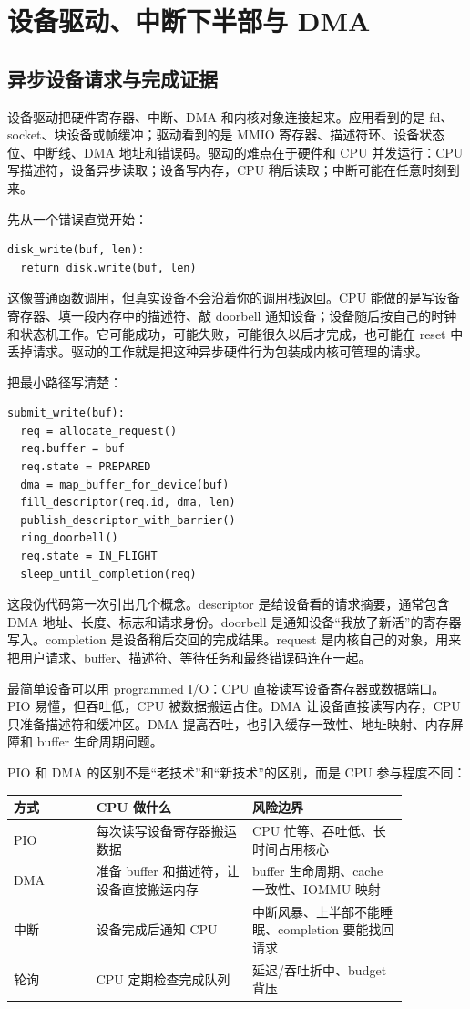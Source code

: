 \chapter{设备驱动、中断下半部与 DMA}

\section{异步设备请求与完成证据}

设备驱动把硬件寄存器、中断、DMA 和内核对象连接起来。应用看到的是 fd、socket、块设备或帧缓冲；驱动看到的是 MMIO 寄存器、描述符环、设备状态位、中断线、DMA 地址和错误码。驱动的难点在于硬件和 CPU 并发运行：CPU 写描述符，设备异步读取；设备写内存，CPU 稍后读取；中断可能在任意时刻到来。

先从一个错误直觉开始：

\begin{lstlisting}
disk_write(buf, len):
  return disk.write(buf, len)
\end{lstlisting}

这像普通函数调用，但真实设备不会沿着你的调用栈返回。CPU 能做的是写设备寄存器、填一段内存中的描述符、敲 doorbell 通知设备；设备随后按自己的时钟和状态机工作。它可能成功，可能失败，可能很久以后才完成，也可能在 reset 中丢掉请求。驱动的工作就是把这种异步硬件行为包装成内核可管理的请求。

把最小路径写清楚：

\begin{lstlisting}
submit_write(buf):
  req = allocate_request()
  req.buffer = buf
  req.state = PREPARED
  dma = map_buffer_for_device(buf)
  fill_descriptor(req.id, dma, len)
  publish_descriptor_with_barrier()
  ring_doorbell()
  req.state = IN_FLIGHT
  sleep_until_completion(req)
\end{lstlisting}

这段伪代码第一次引出几个概念。descriptor 是给设备看的请求摘要，通常包含 DMA 地址、长度、标志和请求身份。doorbell 是通知设备“我放了新活”的寄存器写入。completion 是设备稍后交回的完成结果。request 是内核自己的对象，用来把用户请求、buffer、描述符、等待任务和最终错误码连在一起。

最简单设备可以用 programmed I/O：CPU 直接读写设备寄存器或数据端口。PIO 易懂，但吞吐低，CPU 被数据搬运占住。DMA 让设备直接读写内存，CPU 只准备描述符和缓冲区。DMA 提高吞吐，也引入缓存一致性、地址映射、内存屏障和 buffer 生命周期问题。

PIO 和 DMA 的区别不是“老技术”和“新技术”的区别，而是 CPU 参与程度不同：

\begin{longtable}{|p{0.18\linewidth}|p{0.34\linewidth}|p{0.34\linewidth}|}
\toprule
方式 & CPU 做什么 & 风险边界 \\
\midrule
PIO & 每次读写设备寄存器搬运数据 & CPU 忙等、吞吐低、长时间占用核心 \\\tablerowrule
DMA & 准备 buffer 和描述符，让设备直接搬运内存 & buffer 生命周期、cache 一致性、IOMMU 映射 \\\tablerowrule
中断 & 设备完成后通知 CPU & 中断风暴、上半部不能睡眠、completion 要能找回请求 \\\tablerowrule
轮询 & CPU 定期检查完成队列 & 延迟/吞吐折中、budget 背压 \\
\bottomrule
\end{longtable}

